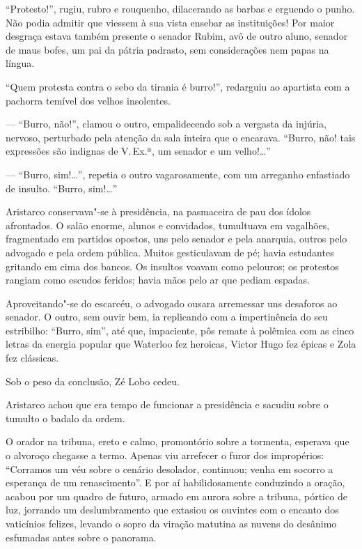 ``Protesto!'', rugiu, rubro e rouquenho, dilacerando
as barbas e erguendo o punho. Não podia admitir que viessem à sua vista
ensebar as instituições! Por maior desgraça estava também presente o
senador Rubim, avô de outro aluno, senador de maus bofes, um pai da
pátria padrasto, sem considerações nem papas na língua. 

``Quem protesta contra o sebo da tirania é burro!'', redarguiu ao apartista com a
pachorra temível dos velhos insolentes. 

--- ``Burro, não!'', clamou o
outro, empalidecendo sob a vergasta da injúria, nervoso, perturbado
pela atenção da sala inteira que o encarava. ``Burro, não! tais
expressões são indignas de V.\,Ex.ª, um senador e um velho!\ldots{}'' 

--- ``Burro, sim!\ldots{}'', repetia o outro vagarosamente, com um arreganho
enfastiado de insulto. ``Burro, sim!\ldots{}''

Aristarco conservava"-se à
presidência, na pasmaceira de pau dos ídolos afrontados. O salão
enorme, alunos e convidados, tumultuava em vagalhões, fragmentado em
partidos opostos, uns pelo senador e pela anarquia, outros pelo
advogado e pela ordem pública. Muitos gesticulavam de pé; havia
estudantes gritando em cima dos bancos. Os insultos voavam como
pelouros; os protestos rangiam como escudos feridos; havia mãos pelo ar
que pediam espadas. 

Aproveitando"-se do escarcéu, o advogado ousara
arremessar uns desaforos ao senador. O outro, sem ouvir bem, ia
replicando com a impertinência do seu estribilho: ``Burro, sim'', até
que, impaciente, pôs remate à polêmica com as cinco letras da energia
popular que Waterloo fez heroicas, Victor Hugo fez épicas e Zola fez
clássicas. 

Sob o peso da conclusão, Zé Lobo cedeu. 

Aristarco achou que
era tempo de funcionar a presidência e sacudiu sobre o tumulto o badalo
da ordem. 

O orador na tribuna, ereto e calmo, promontório sobre a
tormenta, esperava que o alvoroço chegasse a termo. Apenas viu
arrefecer o furor dos impropérios: ``Corramos um véu sobre o cenário
desolador, continuou; venha em socorro a esperança de um renascimento''.
E por aí habilidosamente conduzindo a oração, acabou por um quadro de
futuro, armado em aurora sobre a tribuna, pórtico de luz, jorrando um
deslumbramento que extasiou os ouvintes com o encanto dos vaticínios
felizes, levando o sopro da viração matutina as nuvens do desânimo
esfumadas antes sobre o panorama. 


